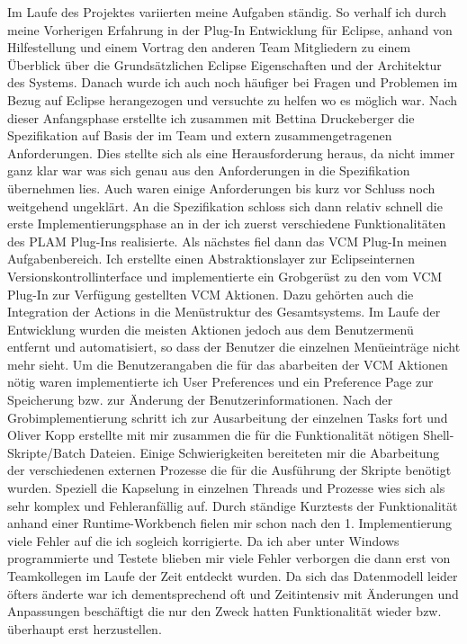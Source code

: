 Im Laufe des Projektes variierten meine Aufgaben ständig. So verhalf ich durch meine Vorherigen Erfahrung in der Plug-In Entwicklung für Eclipse, anhand von Hilfestellung und einem Vortrag den anderen Team Mitgliedern zu einem Überblick über die Grundsätzlichen Eclipse Eigenschaften und der Architektur des Systems. Danach wurde ich auch noch häufiger bei Fragen und Problemen im Bezug auf Eclipse herangezogen und versuchte zu helfen wo es möglich war. 
Nach dieser Anfangsphase erstellte ich zusammen mit Bettina Druckeberger die Spezifikation auf Basis der im Team und extern zusammengetragenen Anforderungen. Dies stellte sich als eine Herausforderung heraus, da nicht immer ganz klar war was sich genau aus den Anforderungen in die Spezifikation übernehmen lies. Auch waren einige Anforderungen bis kurz vor Schluss noch weitgehend ungeklärt. 
An die Spezifikation schloss sich dann relativ schnell die erste Implementierungsphase an in der ich zuerst verschiedene Funktionalitäten des PLAM Plug-Ins realisierte. Als nächstes fiel dann das VCM Plug-In meinen Aufgabenbereich. Ich erstellte einen Abstraktionslayer zur Eclipseinternen Versionskontrollinterface und implementierte ein Grobgerüst zu den vom VCM Plug-In zur Verfügung gestellten VCM Aktionen. Dazu gehörten auch die Integration der Actions in die Menüstruktur des Gesamtsystems. Im Laufe der Entwicklung wurden die meisten Aktionen jedoch aus dem Benutzermenü entfernt und automatisiert, so dass der Benutzer die einzelnen Menüeinträge nicht mehr sieht.
Um die Benutzerangaben die für das abarbeiten der VCM Aktionen nötig waren implementierte ich User Preferences und ein Preference Page zur Speicherung bzw. zur Änderung der Benutzerinformationen. 
Nach der Grobimplementierung schritt ich zur Ausarbeitung der einzelnen Tasks fort und Oliver Kopp erstellte mit mir zusammen die für die Funktionalität nötigen Shell-Skripte/Batch Dateien.
Einige Schwierigkeiten bereiteten mir die Abarbeitung der verschiedenen externen Prozesse die für die Ausführung der Skripte benötigt wurden. Speziell die Kapselung in einzelnen Threads  und Prozesse wies sich als sehr komplex und Fehleranfällig auf. Durch ständige Kurztests der Funktionalität anhand einer Runtime-Workbench fielen mir schon nach den 1. Implementierung viele Fehler auf die ich sogleich korrigierte. Da ich aber unter Windows programmierte und Testete blieben mir viele Fehler verborgen die dann erst von Teamkollegen im Laufe der Zeit entdeckt wurden. Da sich das Datenmodell leider öfters änderte war ich dementsprechend oft und Zeitintensiv mit Änderungen und Anpassungen beschäftigt die nur den Zweck hatten Funktionalität wieder bzw. überhaupt erst herzustellen.

